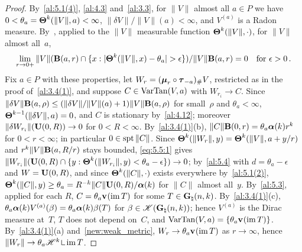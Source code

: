 \begin{proof}
    By~\ref{al:5.1(4)}, \ref{al:4.3} and~\ref{al:3.3}, for $\|V\|$ almost all $a \in P$ we have $0
    < \theta_a = \boldsymbol{\Theta}^{k}(\|V\|,a) < \infty$, $\|\delta V\| / \|V\|(a) < \infty$, and
    $V^{(a)}$ is a Radon measure. By~\cite[2.8.18, 2.9.13]{Federer1969}, applied to the $\|V\|$
    measurable function $\boldsymbol{\Theta}^{k}(\|V\|,\cdot)$, for $\|V\|$ almost all~$a$,
    \begin{equation}
        \label{eq:5.5:1}
        \lim_{r \to 0+} \|V\|(\mathbf{B}(a,r) \cap \{ x : |\boldsymbol{\Theta}^{k}(\|V\|,x) - \theta_a| >
        \epsilon \}) / \|V\| \mathbf{B}(a,r) = 0 \quad \text{for $\epsilon > 0$} \,.
    \end{equation}
    Fix $a \in P$ with these properties, let $W_r = (\boldsymbol{\mu}_{r} \circ \boldsymbol{\tau}_{-a})_\# V$, restricted
    as in the proof of~\ref{al:3.4(1)}, and suppose $C \in \operatorname{VarTan}(V,a)$ with $W_{r_i} \to C$.
    Since $\|\delta V\| \mathbf{B}(a,\rho) \le (\|\delta V\|/\|V\|(a) + 1) \|V\| \mathbf{B}(a,\rho)$ for
    small~$\rho$ and $\theta_a < \infty$, $\boldsymbol{\Theta}^{k-1}(\|\delta V\|,a) = 0$, and $C$ is
    stationary by~\ref{al:4.12}; moreover $\|\delta W_{r_i}\|(\mathbf{U}(0,R)) \to 0$ for $0 < R <
    \infty$. By~\ref{al:3.4(1)}(b), $\|C\| \mathbf{B}(0,r) = \theta_a \boldsymbol{\alpha}(k) r^{k}$
    for $0 < r < \infty$; in particular $0 \in \operatorname{spt} \|C\|$. Since $\boldsymbol{\Theta}^{k}(\|W_r\|,y) =
    \boldsymbol{\Theta}^{k}(\|V\|, a + y/r)$ and $r^{k} \|V\| \mathbf{B}(a,R/r)$ stays bounded, \eqref{eq:5.5:1}
    gives $\|W_{r_i}\|(\mathbf{U}(0,R) \cap \{ y : \boldsymbol{\Theta}^{k}(\|W_{r_i}\|,y) < \theta_a - \epsilon
    \}) \to 0$; by~\ref{al:5.4} with $d = \theta_a - \epsilon$ and $W = \mathbf{U}(0,R)$, and since
    $\boldsymbol{\Theta}^{k}(\|C\|,\cdot)$ exists everywhere by~\ref{al:5.1(2)}, $\boldsymbol{\Theta}^{k}(\|C\|,y)
    \ge \theta_a = R^{-k} \|C\| \mathbf{U}(0,R) / \boldsymbol{\alpha}(k)$ for $\|C\|$ almost all~$y$.
    By~\ref{al:5.3}, applied for each $R$, $C = \theta_a \mathbf{v}_{}(\operatorname{im} T)$ for some $T \in
    \mathbf{G}_{\natural}(n,k)$. By~\ref{al:3.4(1)}(c), $\theta_a \boldsymbol{\alpha}(k) V^{(a)}(\beta) =
    \theta_a \boldsymbol{\alpha}(k) \beta(T)$ for $\beta \in \mathscr{K}(\mathbf{G}_{\natural}(n,k))$; hence
    $V^{(a)}$ is the Dirac measure at~$T$, $T$ does not depend on~$C$, and
    $\operatorname{VarTan}(V,a) = \{ \theta_a \mathbf{v}_{}(\operatorname{im} T) \}$. By~\ref{al:3.4(1)}(a) and~\ref{new:weak_metric},
    $W_r \to \theta_a \mathbf{v}_{}(\operatorname{im} T)$ as $r \to \infty$, hence $\|W_r\| \to \theta_a \HM^{\vdim}
    \restrict \im T$.


\end{proof}
